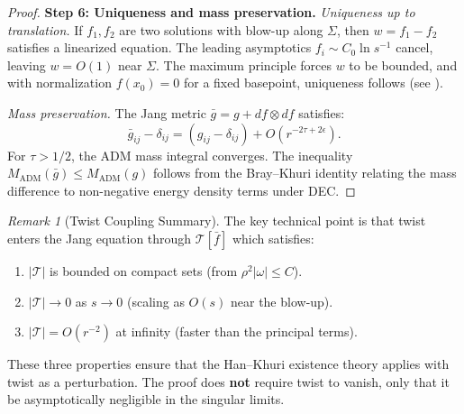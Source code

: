 \documentclass[12pt]{article}
\theoremstyle{plain}
\theoremstyle{definition}
\theoremstyle{remark}
\newtheorem{remark}[theorem]{Remark}
\newcommand{\ADM}{\mathrm{ADM}}
\newcommand{\bg}{\bar{g}}
\begin{document}
\begin{proof}
\textbf{Step 6: Uniqueness and mass preservation.}
\textit{Uniqueness up to translation.} If $f_1, f_2$ are two solutions with blow-up along $\Sigma$, then $w = f_1 - f_2$ satisfies a linearized equation. The leading asymptotics $f_i \sim C_0 \ln s^{-1}$ cancel, leaving $w = O(1)$ near $\Sigma$. The maximum principle forces $w$ to be bounded, and with normalization $f(x_0) = 0$ for a fixed basepoint, uniqueness follows (see \cite[Theorem 3.1]{hankhuri2013}).

\textit{Mass preservation.} The Jang metric $\bg = g + df \otimes df$ satisfies:
\[
\bg_{ij} - \delta_{ij} = (g_{ij} - \delta_{ij}) + O(r^{-2\tau+2\epsilon}).
\]
For $\tau > 1/2$, the ADM mass integral converges. The inequality $M_{\ADM}(\bg) \leq M_{\ADM}(g)$ follows from the Bray--Khuri identity \cite{braykhuri2010} relating the mass difference to non-negative energy density terms under DEC.
\end{proof}

\begin{remark}[Twist Coupling Summary]
The key technical point is that twist enters the Jang equation through $\mathcal{T}[\bar{f}]$ which satisfies:
\begin{enumerate}
    \item $|\mathcal{T}|$ is bounded on compact sets (from $\rho^2|\omega| \leq C$).
    \item $|\mathcal{T}| \to 0$ as $s \to 0$ (scaling as $O(s)$ near the blow-up).
    \item $|\mathcal{T}| = O(r^{-2})$ at infinity (faster than the principal terms).
\end{enumerate}
These three properties ensure that the Han--Khuri existence theory applies with twist as a perturbation. The proof does \textbf{not} require twist to vanish, only that it be asymptotically negligible in the singular limits.
\end{remark}
\end{document}
